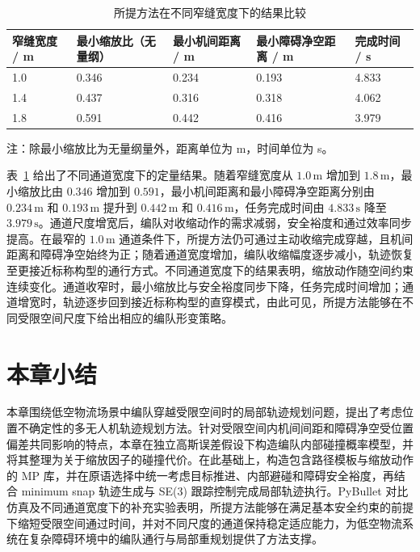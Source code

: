 \begin{table}[!htbp]
    \centering
    \caption{所提方法在不同窄缝宽度下的结果比较}
    \label{tab:elastic_gap_width_metrics}
    \renewcommand{\arraystretch}{1.15}
    \begin{tabular}{p{}p{}p{}p{}p{}}
        \toprule
        窄缝宽度 / m & 最小缩放比（无量纲） & 最小机间距离 / m & 最小障碍净空距离 / m & 完成时间 / s \\
        \midrule
        1.0 & 0.346 & 0.234 & 0.193 & 4.833 \\
        1.4 & 0.437 & 0.316 & 0.318 & 4.062 \\
        1.8 & 0.591 & 0.442 & 0.416 & 3.979 \\
        \bottomrule
    \end{tabular}
    \par\smallskip
    {\footnotesize 注：除最小缩放比为无量纲量外，距离单位为 m，时间单位为 s。}
\end{table}

表~\ref{tab:elastic_gap_width_metrics} 给出了不同通道宽度下的定量结果。随着窄缝宽度从 $1.0\,\mathrm{m}$ 增加到 $1.8\,\mathrm{m}$，最小缩放比由 $0.346$ 增加到 $0.591$，最小机间距离和最小障碍净空距离分别由 $0.234\,\mathrm{m}$ 和 $0.193\,\mathrm{m}$ 提升到 $0.442\,\mathrm{m}$ 和 $0.416\,\mathrm{m}$，任务完成时间由 $4.833\,\mathrm{s}$ 降至 $3.979\,\mathrm{s}$。通道尺度增宽后，编队对收缩动作的需求减弱，安全裕度和通过效率同步提高。在最窄的 $1.0\,\mathrm{m}$ 通道条件下，所提方法仍可通过主动收缩完成穿越，且机间距离和障碍净空始终为正；随着通道宽度增加，编队收缩幅度逐步减小，轨迹恢复至更接近标称构型的通行方式。不同通道宽度下的结果表明，缩放动作随空间约束连续变化。通道收窄时，最小缩放比与安全裕度同步下降，任务完成时间增加；通道增宽时，轨迹逐步回到接近标称构型的直穿模式，由此可见，所提方法能够在不同受限空间尺度下给出相应的编队形变策略。

\section{本章小结}

本章围绕低空物流场景中编队穿越受限空间时的局部轨迹规划问题，提出了考虑位置不确定性的多无人机轨迹规划方法。针对受限空间内机间间距和障碍净空受位置偏差共同影响的特点，本章在独立高斯误差假设下构造编队内部碰撞概率模型，并将其整理为关于缩放因子的碰撞代价。在此基础上，构造包含路径模板与缩放动作的 MP 库，并在原语选择中统一考虑目标推进、内部避碰和障碍安全裕度，再结合 minimum snap 轨迹生成与 SE(3) 跟踪控制完成局部轨迹执行。PyBullet 对比仿真及不同通道宽度下的补充实验表明，所提方法能够在满足基本安全约束的前提下缩短受限空间通过时间，并对不同尺度的通道保持稳定适应能力，为低空物流系统在复杂障碍环境中的编队通行与局部重规划提供了方法支撑。
